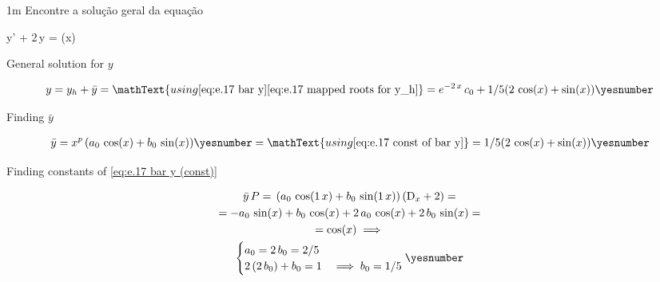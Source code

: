 \documentclass["AM3C-Slides_annotations.tex"]{subfiles}
\begin{document}
\begin{exampleBox}1m{} %
  Encontre a solução geral da equação
  \begin{BM}
    y' + 2\,y = \cos(x)
  \end{BM}
  

  \answer{\eqref{eq:e.17 answer}}

  General solution for \(y\)
  \begin{tcolorbox}
    \begin{gather*}
      y
      = y_h + \bar{y}
      = \mathText{using 
        \eqref{eq:e.17 bar y}
        \eqref{eq:e.17 mapped roots for y_h}
      }
      = e^{-2\,x}\,c_0
      + 1/5( 2\,\cos(x) + \sin(x))
      \yesnumber\label{eq:e.17 answer}
    \end{gather*}
  \end{tcolorbox}

  Finding \(\bar{y}\)
  \begin{tcolorbox}
    \begin{gather*}
      \bar{y}
      = x^p
      \,(
        a_0\,\cos(x)
        + b_0\,\sin(x)
      )
      \yesnumber\label{eq:e.17 bar y (const)}
      = \mathText{using \eqref{eq:e.17 const of bar y}}
      = 1/5( 2\,\cos(x) + \sin(x))
      \yesnumber\label{eq:e.17 bar y}
    \end{gather*}
  \end{tcolorbox}

  Finding constants of \eqref{eq:e.17 bar y (const)}
  \begin{tcolorbox}
    \begin{gather*}
      \bar{y}\,P
      = 
      \,(
        a_0\,\cos(1\,x)
        + b_0\,\sin(1\,x)
      )
      \,(\mdif{x} + 2)
      = \\
      = 
      - a_0\,\sin(x)
      + b_0\,\cos(x)
      + 2\,a_0\,\cos(x)
      + 2\,b_0\,\sin(x)
      = \\
      = \cos(x)
      \implies \\
      \begin{cases}
        a_0 = 2\,b_0 = 2/5
        \\
        2\,(2\,b_0)+b_0 = 1
        & \implies b_0 = 1/5
      \end{cases}
      \yesnumber\label{eq:e.17 const of bar y}
    \end{gather*}
  \end{tcolorbox}


\end{exampleBox}
\end{document}
